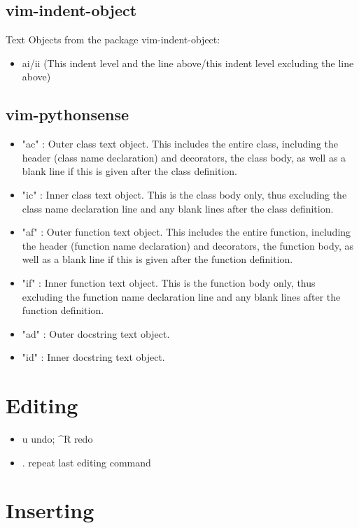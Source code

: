 \documentclass{article}
\begin{document}
\subsection{vim-indent-object}
Text Objects from the package vim-indent-object:
\begin{itemize}
        \item ai/ii (This indent level and the line above/this indent level
            excluding the line above)
\end{itemize}
\subsection{vim-pythonsense}
\begin{itemize}
        
    \item "ac" : Outer class text object. This includes the entire class, including the header (class name declaration) and decorators, the class body, as well as a blank line if this is given after the class definition.
    \item "ic" : Inner class text object. This is the class body only, thus excluding the class name declaration line and any blank lines after the class definition.
    \item "af" : Outer function text object. This includes the entire function, including the header (function name declaration) and decorators, the function body, as well as a blank line if this is given after the function definition.
    \item "if" : Inner function text object. This is the function body only, thus excluding the function name declaration line and any blank lines after the function definition.
    \item "ad" : Outer docstring text object.
    \item "id" : Inner docstring text object.
    \end{itemize}

\section{Editing}

    \begin{itemize}
    \item u undo; \textasciicircum R redo
    \item . repeat last editing command
    \end{itemize}

\section{Inserting}
\end{document}
